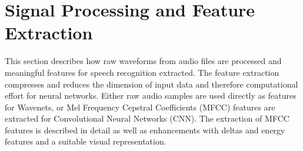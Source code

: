
\chapter{Signal Processing and Feature Extraction}\label{sec:signal}
This section describes how raw waveforms from audio files are processed and meaningful features for speech recognition extracted.
The feature extraction compresses and reduces the dimension of input data and therefore computational effort for neural networks.
Either raw audio samples are used directly as features for Wavenets, or Mel Frequency Cepstral Coefficients (MFCC) features are extracted for Convolutional Neural Networks (CNN).
The extraction of MFCC features is described in detail as well as enhancements with deltas and energy features and a suitable visual representation.




